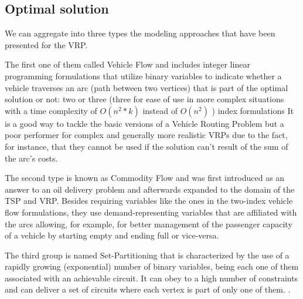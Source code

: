\subsection{Optimal solution} \label{algorithm-vrp-optimal}
We can aggregate into three types the modeling approaches that have been presented for the VRP.
\par
The first one of them called Vehicle Flow and includes integer linear programming formulations that utilize binary variables
to indicate whether a vehicle traverses an arc (path between two vertices) that is part of the optimal solution or not: two or three
(three for ease of use in more complex situations with a time complexity of $O(n^2 * k)$ instead of $O(n^2)$ \cite[p.~11]{optimal-vrp}) index formulations
It is a good way to tackle the basic versions of a Vehicle Routing Problem but a poor performer for complex and generally more realistic VRPs
due to the fact, for instance, that they cannot be used if the solution can't result of the sum of the arc's costs.
\par
The second type is known as Commodity Flow and was first introduced as an answer to an oil delivery problem 
and afterwards expanded to the domain of the TSP and VRP. Besides requiring variables like the ones in the two-index vehicle flow formulations,
they use demand-representing variables that are affiliated with the arcs allowing, for example, for better management of the passenger capacity 
of a vehicle by starting empty and ending full or vice-versa.
\par
The third group is named Set-Partitioning that is characterized by the use of a rapidly growing (exponential) number of binary variables, 
being each one of them associated with an achievable circuit. It can obey to a high number of constraints and can deliver a set of circuits where each vertex is part of only one of them. \cite[p.~21-22]{optimal-vrp}.



